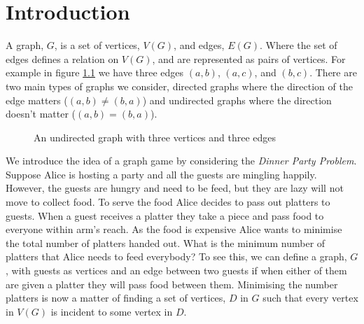 \chapter{Introduction}\label{chpt:into}
A graph, $G$, is a set of vertices, $V(G)$, and edges, $E(G)$. Where the set of edges defines a relation on $V(G)$, and are represented as pairs of vertices. For example in figure \ref{fig:k3} we have three edges $(a,b)$, $(a,c)$, and $(b,c)$. There are two main types of graphs we consider, directed graphs where the direction of the edge matters ($(a,b)\neq (b,a)$) and undirected graphs where the direction doesn't matter ($(a,b)=(b,a)$).

\begin{figure}[h]
    \centering
{}
    \caption{An undirected graph with three vertices and three edges}
\label{fig:k3}
\end{figure}
   
We introduce the idea of a graph game by considering the \textit{Dinner Party Problem}.
Suppose Alice is hosting a party and all the guests are mingling happily. However, the guests are hungry and need to be feed, but they are lazy will not move to collect food. To serve the food Alice decides to pass out platters to guests. When a guest receives a platter they take a piece and pass food to everyone within arm's reach. As the food is expensive Alice wants to minimise the total number of platters handed out. What is the minimum number of platters that Alice needs to feed everybody? To see this, we can define a graph, $G$, with guests as vertices and an edge between two guests if when either of them are given a platter they will pass food between them. Minimising the number platters is now a matter of finding a set of vertices, $D$ in $G$ such that every vertex in $V(G)$ is incident to some vertex in $D$.

